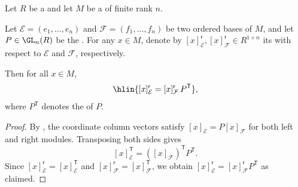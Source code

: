 \begin{lemma} \label{lemma:coordinate_row_vector_transforms_by_change_of_basis_matrix_for_a_free_module_over_a_ring}
    Let $R$ be a  and let $M$ be a  of finite rank $n$.

    Let $\mathcal{E} = (e_1,\ldots,e_n)$ and $\mathcal{F} = (f_1,\ldots,f_n)$ be two ordered bases of $M$, and let $P \in \GL_n(R)$ be the . For any $x \in M$, denote by $[x]_\mathcal{E}^{\mathsf{r}}, [x]_\mathcal{F}^{\mathsf{r}} \in R^{1 \times n}$ its  with respect to $\mathcal{E}$ and $\mathcal{F}$, respectively.

    Then for all $x \in M$,
    $$\hlin{[x]_\mathcal{E}^{\mathsf{r}} = [x]_\mathcal{F}^{\mathsf{r}} \, P^{\mathsf{T}}},$$
    where $P^{\mathsf{T}}$ denotes the  of $P$.
\end{lemma}
\begin{proof}
    By , the coordinate column vectors satisfy $[x]_\mathcal{E} = P [x]_\mathcal{F}$ for both left and right modules. Transposing both sides gives
    $$[x]_\mathcal{E}^{\mathsf{T}} = ([x]_\mathcal{F})^{\mathsf{T}} P^{\mathsf{T}}.$$
    Since $[x]_\mathcal{E}^{\mathsf{r}} = [x]_\mathcal{E}^{\mathsf{T}}$ and $[x]_\mathcal{F}^{\mathsf{r}} = [x]_\mathcal{F}^{\mathsf{T}}$, we obtain $[x]_\mathcal{E}^{\mathsf{r}} = [x]_\mathcal{F}^{\mathsf{r}} P^{\mathsf{T}}$ as claimed.
\end{proof}